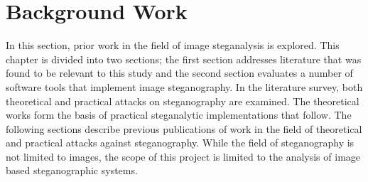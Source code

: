 \documentclass[12pt]{extreport}
\begin{document}
\chapter{Background Work}
\label{ch:bgsurvey}
In this section, prior work in the field of image steganalysis is explored. This chapter is divided into two sections; the first section addresses literature that was found to be relevant to this study and the second section evaluates a number of software tools that implement image steganography.  In the literature survey, both theoretical and practical attacks on steganography are examined. The theoretical works  form the basis of practical steganalytic implementations that follow. 
The following sections describe previous publications of work in the field of theoretical and practical attacks against steganography. While the field of steganography is not limited to images, the scope of this project is limited to the analysis of image based steganographic systems. 
\end{document}
